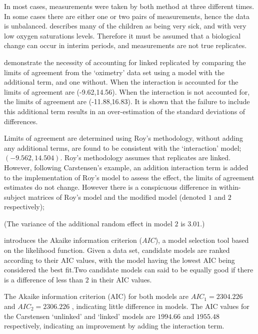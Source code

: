 \documentclass[12pt, a4paper]{report}
\theoremstyle{plain}
\theoremstyle{definition}
\theoremstyle{remark}
\begin{document}
		In most cases, measurements were taken by both method at three different times. In some cases there are either one or two pairs of measurements, hence the data is unbalanced. \citet{BXC2008} describes many of the children as being very sick, and with very low oxygen saturations levels. Therefore it must be assumed that a biological change can occur in interim periods, and measurements are not true replicates.
		
		\citet{BXC2008} demonstrate the necessity of accounting for linked replicated by comparing the limits of agreement from the `oximetry' data set using a model with the additional term, and one without. When the interaction is accounted for the limits of agreement are (-9.62,14.56). When the interaction is not accounted for, the limits of agreement are (-11.88,16.83). It is shown that the failure to include this additional term results in an over-estimation of the standard deviations of differences.
		
		Limits of agreement are determined using Roy's methodology, without adding any additional terms, are found to be consistent with the `interaction' model; $(-9.562, 14.504 )$. Roy's methodology assumes that replicates are linked. However, following Carstensen's example, an addition interaction term is added to the implementation of Roy's model to assess the effect, the limits of agreement estimates do not change. However there is a conspicuous difference in within-subject matrices of Roy's model and the modified model (denoted $1$ and $2$ respectively);
		
		\noindent (The variance of the additional random effect in model $2$ is $3.01$.)
		
		\citet{akaike} introduces the Akaike information criterion ($AIC$), a model
		selection tool based on the likelihood function. Given a data set, candidate models
		are ranked according to their AIC values, with the model having the lowest AIC being considered the best fit.Two candidate models can said to be equally good if there is a difference of less than $2$ in their AIC values.
		
		The Akaike information criterion (AIC) for both models are $AIC_{1} = 2304.226$ and $AIC_{2} = 2306.226$ , indicating little difference in models. The AIC values for the Carstensen `unlinked' and `linked' models are $1994.66$ and $1955.48$ respectively, indicating an improvement by adding the interaction term.
		
\end{document}
